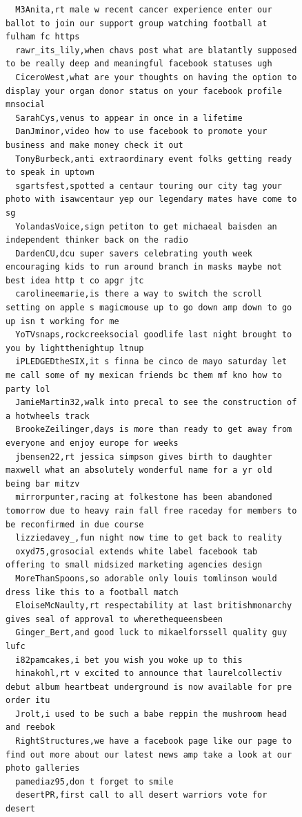 \begin{figure}[htpb]
\begin{verbatim}
  M3Anita,rt male w recent cancer experience enter our ballot to join our support group watching football at fulham fc https
  rawr_its_lily,when chavs post what are blatantly supposed to be really deep and meaningful facebook statuses ugh
  CiceroWest,what are your thoughts on having the option to display your organ donor status on your facebook profile mnsocial
  SarahCys,venus to appear in once in a lifetime
  DanJminor,video how to use facebook to promote your business and make money check it out
  TonyBurbeck,anti extraordinary event folks getting ready to speak in uptown
  sgartsfest,spotted a centaur touring our city tag your photo with isawcentaur yep our legendary mates have come to sg
  YolandasVoice,sign petiton to get michaeal baisden an independent thinker back on the radio
  DardenCU,dcu super savers celebrating youth week encouraging kids to run around branch in masks maybe not best idea http t co apgr jtc
  carolineemarie,is there a way to switch the scroll setting on apple s magicmouse up to go down amp down to go up isn t working for me
  YoTVsnaps,rockcreeksocial goodlife last night brought to you by lightthenightup ltnup
  iPLEDGEDtheSIX,it s finna be cinco de mayo saturday let me call some of my mexican friends bc them mf kno how to party lol
  JamieMartin32,walk into precal to see the construction of a hotwheels track
  BrookeZeilinger,days is more than ready to get away from everyone and enjoy europe for weeks
  jbensen22,rt jessica simpson gives birth to daughter maxwell what an absolutely wonderful name for a yr old being bar mitzv
  mirrorpunter,racing at folkestone has been abandoned tomorrow due to heavy rain fall free raceday for members to be reconfirmed in due course
  lizziedavey_,fun night now time to get back to reality
  oxyd75,grosocial extends white label facebook tab offering to small midsized marketing agencies design
  MoreThanSpoons,so adorable only louis tomlinson would dress like this to a football match
  EloiseMcNaulty,rt respectability at last britishmonarchy gives seal of approval to wherethequeensbeen
  Ginger_Bert,and good luck to mikaelforssell quality guy lufc
  i82pamcakes,i bet you wish you woke up to this
  hinakohl,rt v excited to announce that laurelcollectiv debut album heartbeat underground is now available for pre order itu
  Jrolt,i used to be such a babe reppin the mushroom head and reebok
  RightStructures,we have a facebook page like our page to find out more about our latest news amp take a look at our photo galleries
  pamediaz95,don t forget to smile
  desertPR,first call to all desert warriors vote for desert

\end{verbatim}
\end{figure}
